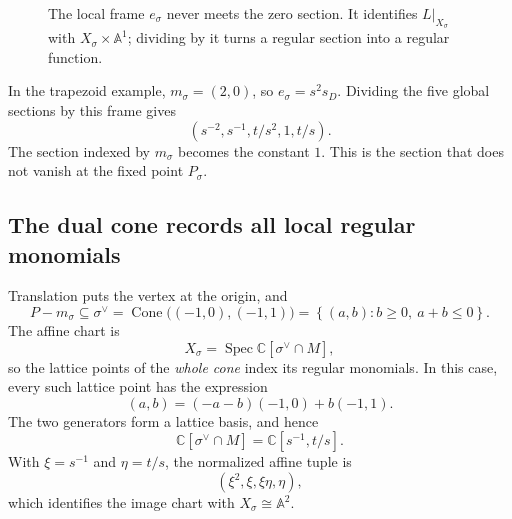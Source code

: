 \documentclass[11pt]{article}
\theoremstyle{definition}
\theoremstyle{remark}
\DeclareMathOperator{\Spec}{Spec}
\DeclareMathOperator{\Cone}{Cone}
\newcommand{\set}[1]{\left\{#1\right\}}
\newcommand{\bA}{\mathbb{A}}
\newcommand{\bC}{\mathbb{C}}
\newcommand{\x}{\times}
\newcommand{\isom}{\cong}
\begin{document}
\begin{figure}[htbp]
    \centering
    \caption{The local frame \(e_\sigma\) never meets the zero section.
    It identifies \(L|_{X_\sigma}\) with \(X_\sigma\x\bA^1\);
    dividing by it turns a regular section into a regular function.}
    \label{fig:oct19-diagram3}
\end{figure}

In the trapezoid example, \(m_\sigma=(2,0)\), so \(e_\sigma=s^2s_D\).
Dividing the five global sections by this frame gives
\[
    (s^{-2},s^{-1},t/s^2,1,t/s).
\]
The section indexed by \(m_\sigma\) becomes the constant \(1\).
This is the section that does not vanish at the fixed point
\(P_\sigma\).

\subsection{The dual cone records all local regular monomials}

Translation puts the vertex at the origin, and
\[
    P-m_\sigma\subseteq\sigma^\vee
      =\Cone\bigl((-1,0),(-1,1)\bigr)
      =\set{(a,b):b\geq0,\ a+b\leq0}.
\]
The affine chart is
\[
    X_\sigma=\Spec\bC[\sigma^\vee\cap M],
\]
so the lattice points of the \emph{whole cone} index its regular
monomials. In this case, every such lattice point has the expression
\[
    (a,b)=(-a-b)(-1,0)+b(-1,1).
\]
The two generators form a lattice basis, and hence
\[
    \bC[\sigma^\vee\cap M]=\bC[s^{-1},t/s].
\]
With \(\xi=s^{-1}\) and \(\eta=t/s\), the normalized affine tuple is
\[
    (\xi^2,\xi,\xi\eta,\eta),
\]
which identifies the image chart with \(X_\sigma\isom\bA^2\).
\end{document}
